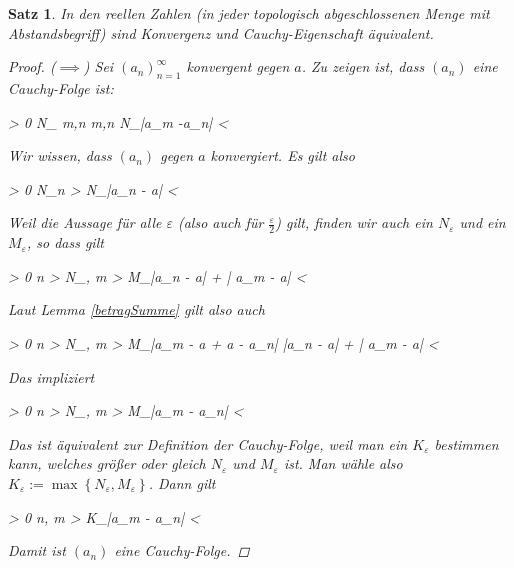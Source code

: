 \documentclass{article}
\newtheorem{thm}{Satz}[section]
\newenvironment{aleq*}{\begin{equation*}\begin{aligned}}{\end{aligned}\end{equation*}}
\begin{document}
	\begin{thm}
		In den reellen Zahlen (in jeder topologisch abgeschlossenen Menge mit Abstandsbegriff) sind Konvergenz und Cauchy-Eigenschaft äquivalent.
		
		\begin{proof}
			(\(\implies\)) Sei \((a_n)_{n=1}^\infty\) konvergent gegen \(a\). Zu zeigen ist, dass \((a_n)\) eine Cauchy-Folge ist:
			\begin{aleq*}
				\forall \varepsilon > 0 \colon \exists N_\varepsilon \in {} \colon \forall m,n \in {} \colon m,n \geq N_\varepsilon \implies |a_m -a_n| < \varepsilon
			\end{aleq*}
			\par
			Wir wissen, dass \((a_n)\) gegen \(a\) konvergiert. Es gilt also
			\begin{aleq*}
				\forall \varepsilon > 0 \colon \exists N_\varepsilon \colon \forall n > N_\varepsilon \colon |a_n - a| < \varepsilon \text{.}
			\end{aleq*}
			\par
			Weil die Aussage für alle \(\varepsilon\) (also auch für \(\frac{\varepsilon}{2}\)) gilt, finden wir auch ein \(N_\varepsilon\) und ein \(M_\varepsilon\), so dass gilt
			\begin{aleq*}
				\forall \varepsilon > 0 \colon \forall n > N_\varepsilon, m > M_\varepsilon \colon |a_n - a| + | a_m - a| < \varepsilon {}
			\end{aleq*}
			
			\par
			Laut Lemma \ref{betragSumme} gilt also auch
			\begin{aleq*}
				\forall \varepsilon > 0 \colon \forall n > N_\varepsilon, m > M_\varepsilon \colon |a_m - a + a - a_n| \leq |a_n - a| + | a_m - a| < \varepsilon \text{.}
			\end{aleq*}
			\par
			Das impliziert
			\begin{aleq*}
				\forall \varepsilon > 0 \colon \forall n > N_\varepsilon, m > M_\varepsilon \colon |a_m - a_n| < \varepsilon {}
			\end{aleq*}
			\par
			Das ist äquivalent zur Definition der Cauchy-Folge, weil man ein \(K_\varepsilon\) bestimmen kann, welches größer oder gleich \(N_\varepsilon\) und \(M_\varepsilon\) ist. Man wähle also \(K_\varepsilon := \max \left\lbrace N_\varepsilon, M_\varepsilon\right\rbrace\). Dann gilt
			\begin{aleq*}
				\forall \varepsilon > 0 \colon \forall n, m > K_\varepsilon \colon |a_m - a_n| < \varepsilon \text{.}
			\end{aleq*}
			\par
			Damit ist \((a_n)\) eine Cauchy-Folge.
		\end{proof}
	\end{thm}
	
\end{document}
